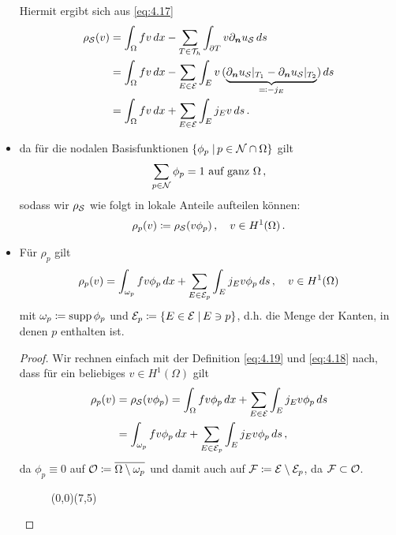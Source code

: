 \begin{itemize}
Hiermit ergibt sich aus \eqref{eq:4.17}
\begin{align}\notag
	\rho_{\mathcal S} (v) &= \int_{\Omega} fv \, dx - \sum_{T\in \mathcal T_h} \int_{\partial T} v \partial_{\boldsymbol n} u_{\mathcal S} \, ds \\
	\notag
	& = \int_{\Omega} fv \, dx - \sum_{E\in \mathcal E} \int_{E} v\, (\underbrace{\partial_{\boldsymbol n} u_{\mathcal S}|_{T_1}-\partial_{\boldsymbol n} u_{\mathcal S}|_{T_2}}_{\eqqcolon -j_E}) \, ds \\
	\label{eq:4.18}
	& =  \int_{\Omega} fv \, dx + \sum_{E\in \mathcal E} \int_{E} j_E v \, ds \, .
\end{align}

\item da für die nodalen Basisfunktionen $\{\phi_p \;\vert\, p \in \mathcal N\cap \Omega\}$ gilt
\[
	\sum_{p \in \mathcal N} \phi_p = 1 \text{ auf ganz } \Omega \, , 
\]
sodass wir $\rho_{\mathcal S}$ wie folgt in lokale Anteile aufteilen können:
\begin{align}\label{eq:4.19}
	\rho_p(v) \coloneqq \rho_{\mathcal S} (v \phi_p) \, , \quad v \in H^1(\Omega) \, .
\end{align}

\item
\begin{lemma}\label{lem:4.14}
Für $\rho_p$ gilt
\begin{align*}
	\rho_p (v) = \int_{\omega_p} f v \phi_p \, dx + \sum_{E\in \mathcal E_p} \int_E j_E v \phi_p \, ds  \, , \quad v \in H^1(\Omega)
\end{align*}
mit $\omega_p \coloneqq \operatorname{supp} \phi_p$ und $\mathcal E_p \coloneqq \{E \in \mathcal E \;\vert\, E \ni p\}$, d.h. die Menge der Kanten, in denen $p$ enthalten ist.
\end{lemma}

\begin{proof}
Wir rechnen einfach mit der Definition \eqref{eq:4.19} und \eqref{eq:4.18} nach, dass für ein beliebiges $v \in H^1(\Omega)$ gilt
\begin{align*}
	\rho_p(v) &= \rho_{\mathcal S} (v \phi_p) =  \int_{\Omega} fv\phi_p \, dx + \sum_{E\in \mathcal E} \int_{E} j_E v \phi_p\, ds \\
	& = \int_{\omega_p} f v \phi_p \, dx + \sum_{E\in \mathcal E_p} \int_E j_E v \phi_p \, ds  \, ,
\end{align*}
da $\phi_p \equiv 0$ auf $\mathcal O \coloneqq \overline{\Omega \setminus \omega_p}$ und damit auch auf $\mathcal F \coloneqq\mathcal E \setminus \mathcal E_p$, da $\mathcal F \subset\mathcal O$.

\begin{figure}[h]
\begin{center}
	\begin{pspicture}(0,0)(7,5)
		

\end{pspicture}
\end{center}
\end{figure}
\end{proof}
\end{itemize}

